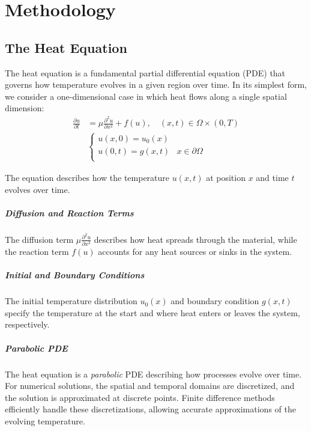\chapter{Methodology}

\section{The Heat Equation}

The heat equation is a fundamental partial differential equation (PDE) that governs how temperature evolves in a given region over time. In its simplest form, we consider a one-dimensional case in which heat flows along a single spatial dimension:
\begin{align*}
  \frac{\partial u}{\partial t} & = \mu \frac{\partial^2 u}{\partial x^2} + f(u), \quad \left( x, t \right) \in \Omega \times \left(0, T\right) \tag{PDE} \\
                                &
  \begin{cases}
    u(x, 0) = u_0(x)  &                       \\
    u(0, t) = g(x, t) & x \in \partial \Omega \\
  \end{cases} \tag{BC}
\end{align*}\label{eq:heat_eq}

The equation describes how the temperature \(u(x, t)\) at position \(x\) and time \(t\) evolves over time.

\paragraph{Diffusion and Reaction Terms}
The diffusion term \(\mu \frac{\partial^2 u}{\partial x^2}\) describes how heat spreads through the material, while the reaction term \(f(u)\) accounts for any heat sources or sinks in the system.

\paragraph{Initial and Boundary Conditions}
The initial temperature distribution \(u_0(x)\) and boundary condition \(g(x, t)\) specify the temperature at the start and where heat enters or leaves the system, respectively.

\paragraph{Parabolic PDE}
The heat equation is a \emph{parabolic} PDE describing how processes evolve over time. For numerical solutions, the spatial and temporal domains are discretized, and the solution is approximated at discrete points. Finite difference methods efficiently handle these discretizations, allowing accurate approximations of the evolving temperature.

